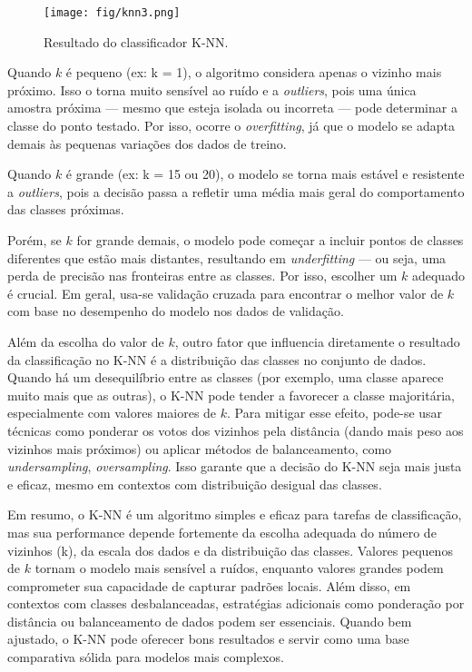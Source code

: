 \documentclass{article}
\begin{document}
   \begin{figure}[ht]
  	\centering %
  	\texttt{[image: fig/knn3.png]} %
  	\caption{Resultado do classificador K-NN.} %
  	\label{knn3} %
  \end{figure}
  
  Quando $k$ é pequeno (ex: k = 1), o algoritmo considera apenas o vizinho mais próximo. Isso o torna muito sensível ao ruído e a \textit{outliers}, pois uma única amostra próxima — mesmo que esteja isolada ou incorreta — pode determinar a classe do ponto testado. Por isso, ocorre o \textit{overfitting}, já que o modelo se adapta demais às pequenas variações dos dados de treino.
  
  Quando $k$ é grande (ex: k = 15 ou 20), o modelo se torna mais estável e resistente a \textit{outliers}, pois a decisão passa a refletir uma média mais geral do comportamento das classes próximas.
  
  Porém, se $k$ for grande demais, o modelo pode começar a incluir pontos de classes diferentes que estão mais distantes, resultando em \textit{underfitting} — ou seja, uma perda de precisão nas fronteiras entre as classes. Por isso, escolher um $k$ adequado é crucial. Em geral, usa-se validação cruzada para encontrar o melhor valor de $k$ com base no desempenho do modelo nos dados de validação.
  
  Além da escolha do valor de $k$, outro fator que influencia diretamente o resultado da classificação no K-NN é a distribuição das classes no conjunto de dados. Quando há um desequilíbrio entre as classes (por exemplo, uma classe aparece muito mais que as outras), o K-NN pode tender a favorecer a classe majoritária, especialmente com valores maiores de $k$. Para mitigar esse efeito, pode-se usar técnicas como ponderar os votos dos vizinhos pela distância (dando mais peso aos vizinhos mais próximos) ou aplicar métodos de balanceamento, como \textit{undersampling}, \textit{oversampling}. Isso garante que a decisão do K-NN seja mais justa e eficaz, mesmo em contextos com distribuição desigual das classes.
  
  Em resumo, o K-NN é um algoritmo simples e eficaz para tarefas de classificação, mas sua performance depende fortemente da escolha adequada do número de vizinhos (k), da escala dos dados e da distribuição das classes. Valores pequenos de $k$ tornam o modelo mais sensível a ruídos, enquanto valores grandes podem comprometer sua capacidade de capturar padrões locais. Além disso, em contextos com classes desbalanceadas, estratégias adicionais como ponderação por distância ou balanceamento de dados podem ser essenciais. Quando bem ajustado, o K-NN pode oferecer bons resultados e servir como uma base comparativa sólida para modelos mais complexos.



\end{document}
